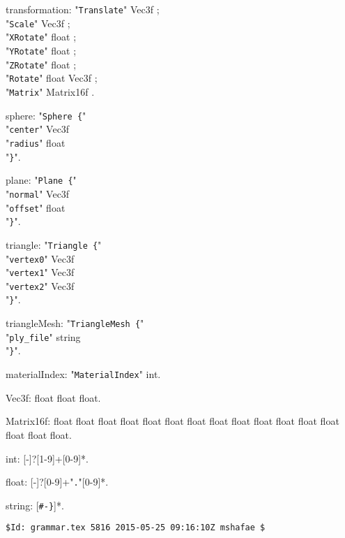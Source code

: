 \documentclass[twoside]{article}
\begin{document}
\begin{grammar}
transformation: "\verb!Translate!" { Vec3f } ;\\
  "\verb!Scale!" { Vec3f } ;\\
  "\verb!XRotate!" { float } ;\\
  "\verb!YRotate!" { float } ;\\
  "\verb!ZRotate!" { float } ;\\
  "\verb!Rotate!" { float Vec3f } ;\\
  "\verb!Matrix!" { Matrix16f }.

sphere: "\verb!Sphere {!"\\
    "\verb!center!" Vec3f\\
    "\verb!radius!" float\\
"\verb!}!".

plane: "\verb!Plane {!"\\
  "\verb!normal!" Vec3f\\
  "\verb!offset!" float\\
"\verb!}!".

triangle: "\verb!Triangle {!"\\
  "\verb!vertex0!" Vec3f\\
  "\verb!vertex1!" Vec3f\\
  "\verb!vertex2!" Vec3f\\
"\verb!}!".

triangleMesh: "\verb!TriangleMesh {!"\\
  "\verb!ply_file!" string\\
"\verb!}!".

materialIndex: "\verb!MaterialIndex!" int.

Vec3f: float float float.

Matrix16f: float float float float float float float float float float float float float float float float.

int: [-]?[1-9]+[0-9]*.

float: [-]?[0-9]+"\verb!.!"[0-9]*.

string: [\verb!#-}!]*.

\end{grammar}
\vfill
\tiny
\begin{verbatim}
$Id: grammar.tex 5816 2015-05-25 09:16:10Z mshafae $
\end{verbatim}
\end{document}
